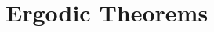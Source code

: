 \chapter{Ergodic Theorems}

\begin{definition}
    
\end{definition}

\begin{theorem}
    
\end{theorem}

\begin{example}
    
\end{example}